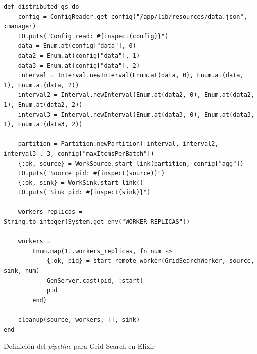 \documentclass[11pt]{article}
\newcommand{\english}[1]{\textit{#1}}
\begin{document}
\begin{listing}[ht]
\begin{verbatim}
def distributed_gs do
    config = ConfigReader.get_config("/app/lib/resources/data.json", :manager)
    IO.puts("Config read: #{inspect(config)}")
    data = Enum.at(config["data"], 0)
    data2 = Enum.at(config["data"], 1)
    data3 = Enum.at(config["data"], 2)
    interval = Interval.newInterval(Enum.at(data, 0), Enum.at(data, 1), Enum.at(data, 2))
    interval2 = Interval.newInterval(Enum.at(data2, 0), Enum.at(data2, 1), Enum.at(data2, 2))
    interval3 = Interval.newInterval(Enum.at(data3, 0), Enum.at(data3, 1), Enum.at(data3, 2))
    
    partition = Partition.newPartition([interval, interval2, interval3], 3, config["maxItemsPerBatch"])
    {:ok, source} = WorkSource.start_link(partition, config["agg"])
    IO.puts("Source pid: #{inspect(source)}")
    {:ok, sink} = WorkSink.start_link()
    IO.puts("Sink pid: #{inspect(sink)}")
    
    workers_replicas = String.to_integer(System.get_env("WORKER_REPLICAS"))
    
    workers =
        Enum.map(1..workers_replicas, fn num ->
            {:ok, pid} = start_remote_worker(GridSearchWorker, source, sink, num)
            GenServer.cast(pid, :start)
            pid
        end)
    
    cleanup(source, workers, [], sink)
end
\end{verbatim}
\caption{Definición del \english{pipeline} para Grid Search en Elixir}
\label{code:elx:gs}
\end{listing}
\end{document}
